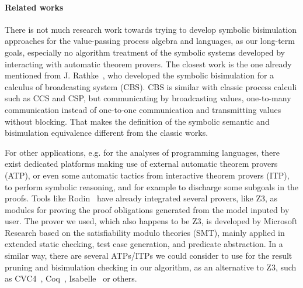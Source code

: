 \documentclass{lncs/llncs}
\newcommand{\TODO}[1]{\textcolor{red}{\textbf{[TODO:#1]}}}
\begin{document}
\paragraph{Related works}




There is not much research work towards trying to develop symbolic bisimulation approaches
for the value-passing process algebra and languages, as our long-term goals,
especially no algorithm treatment of the symbolic systems developed by
interacting with automatic theorem provers. The closest work is the
one already mentioned from J. Rathke~\cite{HennessyRathke:TCS98},
who developed the symbolic bisimulation for a
calculus of broadcasting system (CBS). CBS is similar with classic
process calculi such as CCS and CSP, but communicating by broadcasting
values, one-to-many communication instead of one-to-one communication
and transmitting values without blocking. That makes the definition of
the symbolic semantic and bisimulation equivalence different from the
classic works.


For other applications, e.g. for the analyses of 
programming languages, there exist dedicated platforms making use of
external automatic theorem 
provers (ATP), or even some automatic tactics from interactive theorem
provers (ITP), to perform symbolic reasoning, and for example to
discharge some subgoals in the proofs.
Tools like Rodin~\cite{deharbe2013,deharbe2014,abrial2007} have
already integrated several provers, like Z3, as modules for proving
the proof obligations generated from the model inputed by user. 
The prover we used, which also happens to be Z3, is developed by Microsoft Research
based on the satisfiability modulo 
theories (SMT), mainly applied in extended static checking, test case
generation, and predicate abstraction.
In a similar way, there are several ATPs/ITPs we could consider to use for
the result pruning and bisimulation checking in our algorithm, as an
alternative to Z3, such as CVC4~\cite{barrett:CAV2011},
Coq~\cite{armand:CPP2011},
Isabelle~\cite{blanchette:FroCoS2011} or others. 
\end{document}
